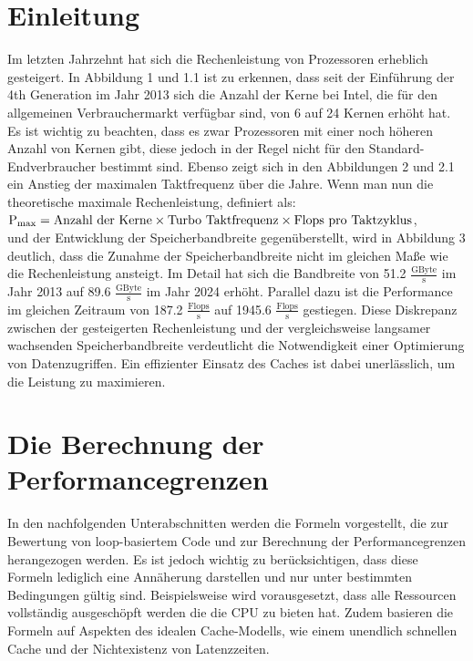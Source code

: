 \documentclass[sigconf,language=english]{acmart}
\begin{document}
\section{Einleitung}
    Im letzten Jahrzehnt hat sich die Rechenleistung von Prozessoren erheblich gesteigert. 
    In Abbildung 1 und 1.1 ist zu erkennen, dass seit der Einführung der 4th Generation im Jahr 2013 sich die Anzahl der Kerne bei Intel, 
    die für den allgemeinen Verbrauchermarkt verfügbar sind, von 6 auf 24 Kernen erhöht hat.
    Es ist wichtig zu beachten, dass es zwar Prozessoren mit einer noch höheren Anzahl von Kernen gibt, 
    diese jedoch in der Regel nicht für den Standard-Endverbraucher bestimmt sind. 
    Ebenso zeigt sich in den Abbildungen 2 und 2.1 ein Anstieg der maximalen Taktfrequenz über die Jahre. 
    Wenn man nun die theoretische maximale Rechenleistung, 
    definiert als:\\ $\textnormal{P}_{\textnormal{max}} = \text{Anzahl der Kerne} \times \text{Turbo Taktfrequenz} \times \text{Flops pro Taktzyklus}$,\\und
    der Entwicklung der Speicherbandbreite gegenüberstellt, wird in Abbildung 3 deutlich, 
    dass die Zunahme der Speicherbandbreite nicht im gleichen Maße wie die Rechenleistung ansteigt. 
    Im Detail hat sich die Bandbreite von 51.2 $\frac{\text{GByte}}{\text{s}}$ im Jahr 2013 auf 89.6 $\frac{\text{GByte}}{\text{s}}$ im Jahr 2024 erhöht. 
    Parallel dazu ist die Performance im gleichen Zeitraum von 187.2 $\frac{\text{Flops}}{\text{s}}$ auf 1945.6 $\frac{\text{Flops}}{\text{s}}$ gestiegen. 
    Diese Diskrepanz zwischen der gesteigerten Rechenleistung und der vergleichsweise langsamer wachsenden Speicherbandbreite 
    verdeutlicht die Notwendigkeit einer Optimierung von Datenzugriffen. 
    Ein effizienter Einsatz des Caches ist dabei unerlässlich, um die Leistung zu maximieren.

    \section{Die Berechnung der Performancegrenzen}
    In den nachfolgenden Unterabschnitten werden die Formeln vorgestellt, 
    die zur Bewertung von loop-basiertem Code und zur Berechnung der Performancegrenzen herangezogen werden. 
    Es ist jedoch wichtig zu berücksichtigen, dass diese Formeln lediglich eine Annäherung darstellen 
    und nur unter bestimmten Bedingungen gültig sind. Beispielsweise wird vorausgesetzt, 
    dass alle Ressourcen vollständig ausgeschöpft werden die die CPU zu bieten hat. 
    Zudem basieren die Formeln auf Aspekten des idealen Cache-Modells, 
    wie einem unendlich schnellen Cache und der Nichtexistenz von Latenzzeiten.
\end{document}
